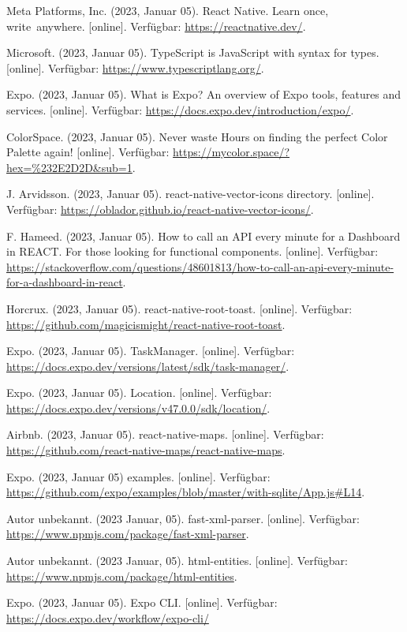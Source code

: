\documentclass[12pt,oneside]{report}
\begin{document}
  \begin{thebibliography}{10}
  	 Meta Platforms, Inc. (2023, Januar 05). React Native. Learn once, write anywhere. [online]. Verfügbar: \url{https://reactnative.dev/}.
  	
  	 Microsoft. (2023, Januar 05). TypeScript is JavaScript with syntax for types. [online]. Verfügbar: \url{https://www.typescriptlang.org/}.
  	
  	 Expo. (2023, Januar 05). What is Expo? An overview of Expo tools, features and services. [online]. Verfügbar: \url{https://docs.expo.dev/introduction/expo/}.
  	
  	 ColorSpace. (2023, Januar 05). Never waste Hours on finding the perfect Color Palette again! [online]. Verfügbar: \url{https://mycolor.space/?hex=%232E2D2D&sub=1}.
  	
  	 J. Arvidsson. (2023, Januar 05). react-native-vector-icons directory. [online]. Verfügbar: \url{https://oblador.github.io/react-native-vector-icons/}.
  	
	 F. Hameed. (2023, Januar 05). How to call an API every minute for a Dashboard in REACT. For those looking for functional components. [online]. Verfügbar: \url{https://stackoverflow.com/questions/48601813/how-to-call-an-api-every-minute-for-a-dashboard-in-react}.
	
	 Horcrux. (2023, Januar 05). react-native-root-toast. [online]. Verfügbar: \url{https://github.com/magicismight/react-native-root-toast}.
	
	 Expo. (2023, Januar 05). TaskManager. [online]. Verfügbar: \url{https://docs.expo.dev/versions/latest/sdk/task-manager/}.
	
	 Expo. (2023, Januar 05). Location. [online]. Verfügbar: \url{https://docs.expo.dev/versions/v47.0.0/sdk/location/}.
	
	 Airbnb. (2023, Januar 05). react-native-maps. [online]. Verfügbar: \url{https://github.com/react-native-maps/react-native-maps}.
	
	 Expo. (2023, Januar 05) examples. [online]. Verfügbar: \url{https://github.com/expo/examples/blob/master/with-sqlite/App.js#L14}.
	
	 Autor unbekannt. (2023 Januar, 05). fast-xml-parser. [online]. Verfügbar: \url{https://www.npmjs.com/package/fast-xml-parser}.
	
	 Autor unbekannt. (2023 Januar, 05). html-entities. [online]. Verfügbar: \url{https://www.npmjs.com/package/html-entities}.
	
	 Expo. (2023, Januar 05). Expo CLI. [online]. Verfügbar: \url{https://docs.expo.dev/workflow/expo-cli/}
  \end{thebibliography}
  \newpage
  
  \listoffigures
  \newpage
  \renewcommand{\lstlistlistingname}{Listingverzeichnis}
  \lstlistoflistings
  
\end{document}
